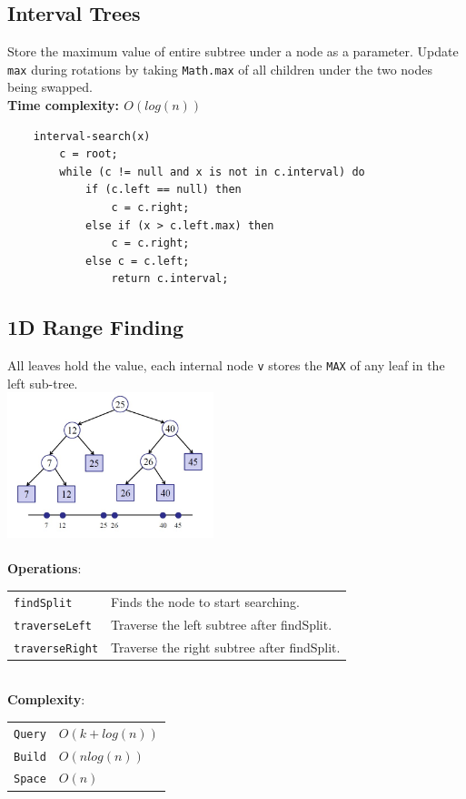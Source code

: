 \documentclass[10pt,landscape,a4paper]{article}
\begin{document}
\begin{multicols*}{4}
\subsection{Interval Trees}
Store the maximum value of entire subtree under a node as a parameter. Update \texttt{max} during rotations by taking \texttt{Math.max} of all children under the two nodes being swapped. \\
\textbf{Time complexity: $O(log(n))$} \\
\begin{lstlisting}
    interval-search(x)
        c = root;
        while (c != null and x is not in c.interval) do
            if (c.left == null) then
                c = c.right;
            else if (x > c.left.max) then
                c = c.right;
            else c = c.left;
                return c.interval;
\end{lstlisting}

\subsection{1D Range Finding}
All leaves hold the value, each internal node \texttt{v} stores the \texttt{MAX} of any leaf in the left sub-tree. \\
\includegraphics[width = 6cm]{1d-range} \\\\
\textbf{Operations}: \\
\begin{tabular}{p{2cm} p{3.5cm}}
    \verb!findSplit!        & Finds the node to start searching. \\
    \verb!traverseLeft!     & Traverse the left subtree after findSplit. \\
    \verb!traverseRight!    & Traverse the right subtree after findSplit.\\
\end{tabular}\\
\textbf{Complexity}: \\
\begin{tabular}{p{2cm} p{3.5cm}}    
    \verb!Query!    & $O(k + log(n))$ \\
    \verb!Build!    & $O(nlog(n))$ \\
    \verb!Space!    & $O(n)$ \\
\end{tabular}


\end{multicols*}
\end{document}

